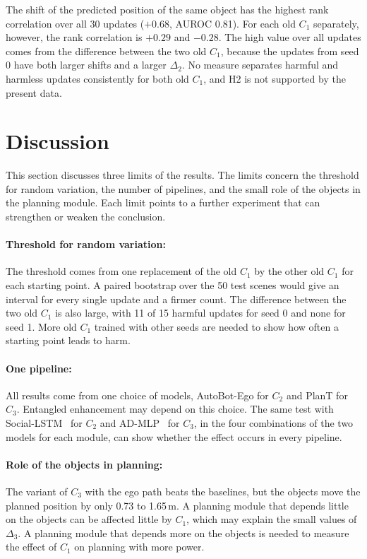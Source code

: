 \documentclass[11pt,a4paper]{article}
\begin{document}
The shift of the predicted position of the same object has the highest rank
correlation over all 30 updates ($+0.68$, AUROC 0.81). For each old $C_1$
separately, however, the rank correlation is $+0.29$ and $-0.28$. The high
value over all updates comes from the difference between the two old $C_1$,
because the updates from seed 0 have both larger shifts and a larger
$\Delta_2$. No measure separates harmful and harmless updates consistently for
both old $C_1$, and H2 is not supported by the present data.

\section{Discussion}

This section discusses three limits of the results. The limits concern the
threshold for random variation, the number of pipelines, and the small role of
the objects in the planning module. Each limit points to a further experiment
that can strengthen or weaken the conclusion.

\paragraph{Threshold for random variation:} The threshold comes from one
replacement of the old $C_1$ by the other old $C_1$ for each starting point. A
paired bootstrap over the 50 test scenes would give an interval for every
single update and a firmer count. The difference between the two old $C_1$ is
also large, with 11 of 15 harmful updates for seed 0 and none for seed 1.
More old $C_1$ trained with other seeds are needed to show how often a
starting point leads to harm.

\paragraph{One pipeline:} All results come from one choice of models,
AutoBot-Ego for $C_2$ and PlanT for $C_3$. Entangled enhancement may depend on
this choice. The same test with Social-LSTM~\cite{alahi2016social} for $C_2$
and AD-MLP~\cite{zhai2023rethinking} for $C_3$, in the four combinations of
the two models for each module, can show whether the effect occurs in every
pipeline.

\paragraph{Role of the objects in planning:} The variant of $C_3$ with the
ego path beats the baselines, but the objects move the planned position by
only 0.73 to 1.65\,m. A planning module that depends little on the objects
can be affected little by $C_1$, which may explain the small values of
$\Delta_3$. A planning module that depends more on the objects is needed to
measure the effect of $C_1$ on planning with more power.
\end{document}
